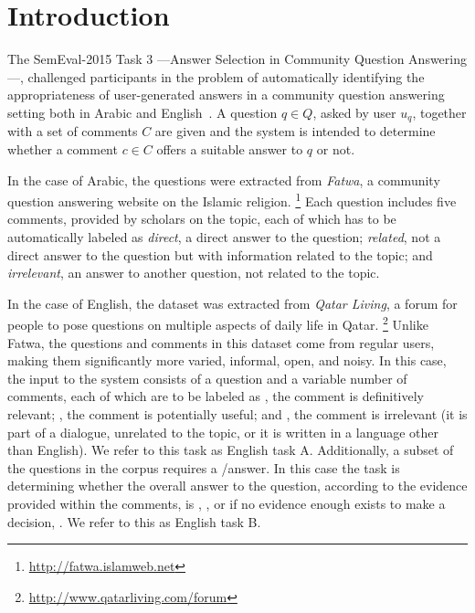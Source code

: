 \section{Introduction}
\label{sec:intro}


The SemEval-2015 Task 3 ---Answer Selection in Community Question Answering---, 
challenged participants in the problem of automatically identifying the 
appropriateness of user-generated answers in a community question answering 
setting both in Arabic and English~\cite{Marquez-EtAl:2015:SemEval}. A question 
$q\in Q$, asked by user $u_q$, together with a set of comments $C$ are given and 
the system is intended to determine whether a comment $c\in C$ offers a suitable 
answer to $q$ or not. 

In the case of Arabic, the questions were extracted from \textit{Fatwa}, a 
community question answering website on the Islamic religion.%
\footnote{\url{http://fatwa.islamweb.net}} 
Each question includes five comments, provided by scholars on 
the topic, each of which has to be automatically labeled as 
\Ni \textit{direct}, a direct answer to the question;
\Nii \textit{related}, not a direct answer to the question but with information 
related to the topic; and 
\Niii \textit{irrelevant}, an answer to another question, not related to the 
topic. 

In the case of English, the dataset was extracted from \textit{Qatar Living}, 
a forum for people to pose questions on multiple aspects of daily life in 
Qatar.%
\footnote{\url{http://www.qatarliving.com/forum}}
Unlike Fatwa, the questions and comments in this dataset come from regular 
users, making them significantly more varied, informal, open, and noisy. In 
this case, 
the input to the system consists of a question and a variable number of 
comments, each of which are to be labeled as 
\Ni \good, the comment is definitively relevant; 
\Nii \pot, the comment is potentially useful; and 
\Niii \bad, the comment is irrelevant (\eg it is part of a dialogue, unrelated 
to the topic, or it is written in a language other than English). 
We refer to this task as English task A. Additionally, a subset of the 
questions in the corpus requires a \yes/\no answer.
In this case the task is determining whether the overall answer to the question, 
according to the evidence provided within the comments, is 
\Ni \yes, 
\Nii \no, or if no evidence enough exists to make a decision, 
\Niii \unsure. 
We refer to this as English task B. 

